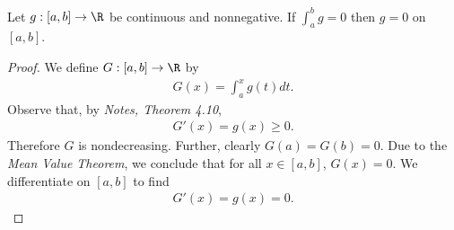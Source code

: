 \documentclass{article}
\begin{document}
\begin{claim*}
   Let $g:[a,b]\to\R$ be continuous and nonnegative. If $\int_a^b g = 0$ then 
   $g=0$ on $[a,b]$.
\end{claim*}
\begin{proof}
   We define $G:[a,b]\to\R$ by 
   \begin{align}
      G(x) = \int_a^x g(t)dt.
   \end{align}
   Observe that, by \emph{Notes, Theorem 4.10},
   \begin{align*}
      G'(x) = g(x) \geq 0. 
   \end{align*}
   Therefore $G$ is nondecreasing. Further, clearly $G(a)=G(b)=0$.
   Due to the \emph{Mean Value Theorem}, we conclude that for all $x\in[a,b]$, $G(x) = 0$.
   We differentiate on $[a,b]$ to find 
   \begin{align*}
      G'(x) = g(x) = 0.
   \end{align*}
\end{proof}
\end{document}
